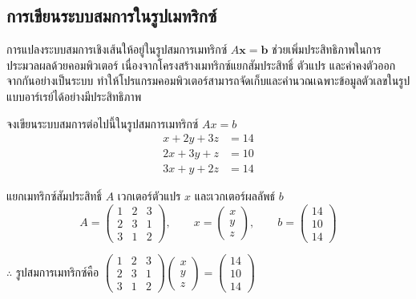 \subsection{การเขียนระบบสมการในรูปเมทริกซ์}
\label{ssec:matrix-system-form}
การแปลงระบบสมการเชิงเส้นให้อยู่ในรูปสมการเมทริกซ์ $A\mathbf{x} = \mathbf{b}$ ช่วยเพิ่มประสิทธิภาพในการประมวลผลด้วยคอมพิวเตอร์ เนื่องจากโครงสร้างเมทริกซ์แยกสัมประสิทธิ์ ตัวแปร และค่าคงตัวออกจากกันอย่างเป็นระบบ ทำให้โปรแกรมคอมพิวเตอร์สามารถจัดเก็บและคำนวณเฉพาะข้อมูลตัวเลขในรูปแบบอาร์เรย์ได้อย่างมีประสิทธิภาพ~\parencite{anton2019linear}

\begin{ex}
\label{ex:system-to-matrix}
จงเขียนระบบสมการต่อไปนี้ในรูปสมการเมทริกซ์ $Ax = b$
\[
\begin{aligned}
x + 2y + 3z &= 14 \\
2x + 3y + z &= 10 \\
3x + y + 2z &= 14
\end{aligned}
\]
\end{ex}
\begin{solution}
แยกเมทริกซ์สัมประสิทธิ์ $A$ เวกเตอร์ตัวแปร $x$ และเวกเตอร์ผลลัพธ์ $b$ \[ A = \begin{pmatrix} 1 & 2 & 3 \\ 2 & 3 & 1 \\ 3 & 1 & 2 \end{pmatrix}, \qquad x = \begin{pmatrix} x \\ y \\ z \end{pmatrix}, \qquad b = \begin{pmatrix} 14 \\ 10 \\ 14 \end{pmatrix} \]

$\therefore$ รูปสมการเมทริกซ์คือ $\begin{pmatrix} 1 & 2 & 3 \\ 2 & 3 & 1 \\ 3 & 1 & 2 \end{pmatrix} \begin{pmatrix} x \\ y \\ z \end{pmatrix} = \begin{pmatrix} 14 \\ 10 \\ 14 \end{pmatrix}$ \solhere
\end{solution}

